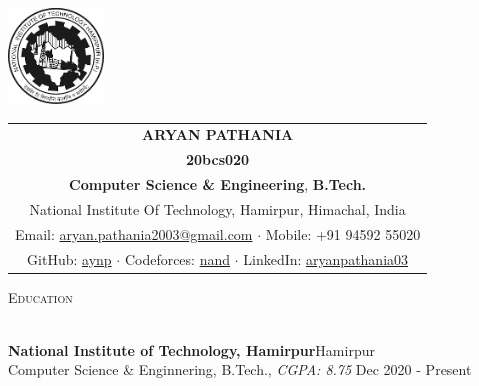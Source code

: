 \documentclass[a4paper]{article}
\newcommand{\lineunder} {
    \vspace*{-8pt} \\
    \hspace*{-18pt} \hrulefill \\
}
\newcommand{\header} [1] {
    {\hspace*{-18pt}\vspace*{6pt} \textsc{#1}}
    \vspace*{-6pt} \lineunder
}
\begin{document}
\begin{table}
    \begin{minipage}{0.15\linewidth}
        \centering
        \vspace*{-5mm}
        \includegraphics[height =1in]{nith.png}
    \end{minipage}
    \begin{minipage}{0.10\linewidth}
        {\centering
        \setlength{\tabcolsep}{50pt}
        \def\arraystretch{1.1}
        \begin{tabular}{ c }
            \textbf{\Large{ARYAN PATHANIA}}\\
            \textbf{20bcs020}\\
            \textbf{Computer Science \& Engineering},  \textbf{B.Tech.} \\
            National Institute Of Technology, Hamirpur, Himachal, India\\

            Email: {\color{blue}\href{mailto:aryan.pathania2003@gmail.com} {aryan.pathania2003@gmail.com}} $\cdot$ Mobile: +91 94592 55020\\

            GitHub: \href{https://www.github.com/aynp}{aynp} $\cdot$
            Codeforces: \href{https://codeforces.com/profile/nand}{nand} $\cdot$
            LinkedIn: \href{https://www.linkedin.com/in/aryanpathania03/}{aryanpathania03}
        \end{tabular}
        }
    \end{minipage}\hfill
\end{table}

\vspace*{-12mm}


\header{Education}
\vspace{1mm}

\textbf{National Institute of Technology, Hamirpur}\hfill Hamirpur\\
Computer Science \& Enginnering, B.Tech., \textit{CGPA: 8.75} \hfill Dec 2020 - Present\\
\vspace{1.5mm}
\end{document}
